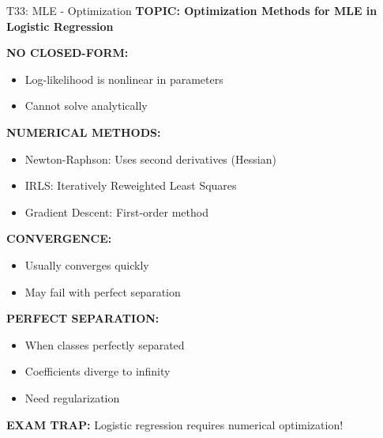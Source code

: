 \documentclass[8pt]{beamer}
\begin{document}
	\begin{frame}{T33: MLE - Optimization}
		\fontsize{6.5}{7.5}\selectfont
		\textbf{TOPIC: Optimization Methods for MLE in Logistic Regression}
		
		\vspace{0.1cm}
		\textbf{NO CLOSED-FORM:}
		\begin{itemize}
			\item Log-likelihood is nonlinear in parameters
			\item Cannot solve analytically
		\end{itemize}
		
		\vspace{0.1cm}
		\textbf{NUMERICAL METHODS:}
		\begin{itemize}
			\item \textcolor{myblue}{Newton-Raphson:} Uses second derivatives (Hessian)
			\item \textcolor{myblue}{IRLS:} Iteratively Reweighted Least Squares
			\item \textcolor{myblue}{Gradient Descent:} First-order method
		\end{itemize}
		
		\vspace{0.1cm}
		\textbf{CONVERGENCE:}
		\begin{itemize}
			\item Usually converges quickly
			\item May fail with perfect separation
		\end{itemize}
		
		\vspace{0.1cm}
		\textbf{PERFECT SEPARATION:}
		\begin{itemize}
			\item When classes perfectly separated
			\item Coefficients diverge to infinity
			\item Need regularization
		\end{itemize}
		
		\textcolor{myred}{\textbf{EXAM TRAP:}} Logistic regression requires \textcolor{myblue}{numerical optimization}!
	\end{frame}
	
\end{document}

